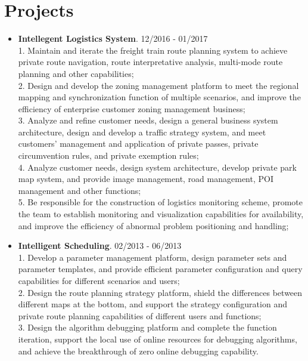 \documentclass[letterpaper, UTF8]{article}
\begin{document}
	\section*{\textbf{Projects}}
	\begin{itemize}
		\item \textbf{Intellegent Logistics System}. 12/2016 - 01/2017\\
		1. Maintain and iterate the freight train route planning system to achieve private route navigation, route interpretative analysis, multi-mode route planning and other capabilities;\\
		2. Design and develop the zoning management platform to meet the regional mapping and synchronization function of multiple scenarios, and improve the efficiency of enterprise customer zoning management business;\\
		3. Analyze and refine customer needs, design a general business system architecture, design and develop a traffic strategy system, and meet customers' management and application of private passes, private circumvention rules, and private exemption rules;\\
		4. Analyze customer needs, design system architecture, develop private park map system, and provide image management, road management, POI management and other functions;\\
		5. Be responsible for the construction of logistics monitoring scheme, promote the team to establish monitoring and visualization capabilities for availability, and improve the efficiency of abnormal problem positioning and handling;
		
		\item \textbf{Intelligent Scheduling}. 02/2013 - 06/2013\\
		1. Develop a parameter management platform, design parameter sets and parameter templates, and provide efficient parameter configuration and query capabilities for different scenarios and users;\\
		2. Design the route planning strategy platform, shield the differences between different maps at the bottom, and support the strategy configuration and private route planning capabilities of different users and functions; \\
		3. Design the algorithm debugging platform and complete the function iteration, support the local use of online resources for debugging algorithms, and achieve the breakthrough of zero online debugging capability.
		

\end{itemize}
\end{document}
